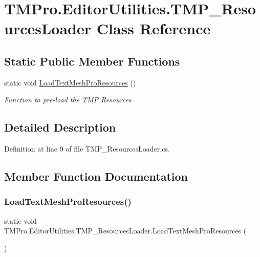 \hypertarget{class_t_m_pro_1_1_editor_utilities_1_1_t_m_p___resources_loader}{}\section{T\+M\+Pro.\+Editor\+Utilities.\+T\+M\+P\+\_\+\+Resources\+Loader Class Reference}
\label{class_t_m_pro_1_1_editor_utilities_1_1_t_m_p___resources_loader}
\subsection*{Static Public Member Functions}
\begin{DoxyCompactItemize}
\item 
static void \mbox{\hyperlink{class_t_m_pro_1_1_editor_utilities_1_1_t_m_p___resources_loader_aa785f8f9599a9dbab4789c9024763f59}{Load\+Text\+Mesh\+Pro\+Resources}} ()
\begin{DoxyCompactList}\small\item\em Function to pre-\/load the T\+MP Resources \end{DoxyCompactList}\end{DoxyCompactItemize}


\subsection{Detailed Description}


Definition at line 9 of file T\+M\+P\+\_\+\+Resources\+Loader.\+cs.



\subsection{Member Function Documentation}
\mbox{\label{class_t_m_pro_1_1_editor_utilities_1_1_t_m_p___resources_loader_aa785f8f9599a9dbab4789c9024763f59}} 
\subsubsection{\texorpdfstring{LoadTextMeshProResources()}{LoadTextMeshProResources()}}
{\footnotesize\ttfamily static void T\+M\+Pro.\+Editor\+Utilities.\+T\+M\+P\+\_\+\+Resources\+Loader.\+Load\+Text\+Mesh\+Pro\+Resources (\begin{DoxyParamCaption}{ }\end{DoxyParamCaption})\hspace{0.3cm}{\ttfamily [static]}}



